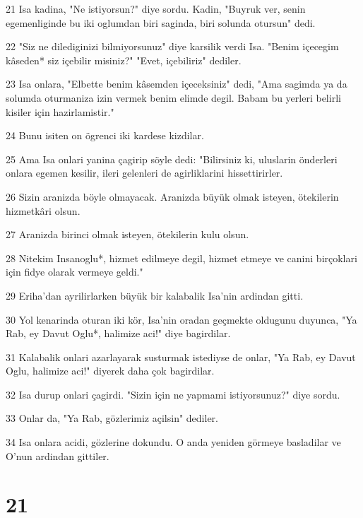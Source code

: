 \par 21 Isa kadina, "Ne istiyorsun?" diye sordu. Kadin, "Buyruk ver, senin egemenliginde bu iki oglumdan biri saginda, biri solunda otursun" dedi.
\par 22 "Siz ne dilediginizi bilmiyorsunuz" diye karsilik verdi Isa. "Benim içecegim kâseden* siz içebilir misiniz?" "Evet, içebiliriz" dediler.
\par 23 Isa onlara, "Elbette benim kâsemden içeceksiniz" dedi, "Ama sagimda ya da solumda oturmaniza izin vermek benim elimde degil. Babam bu yerleri belirli kisiler için hazirlamistir."
\par 24 Bunu isiten on ögrenci iki kardese kizdilar.
\par 25 Ama Isa onlari yanina çagirip söyle dedi: "Bilirsiniz ki, uluslarin önderleri onlara egemen kesilir, ileri gelenleri de agirliklarini hissettirirler.
\par 26 Sizin aranizda böyle olmayacak. Aranizda büyük olmak isteyen, ötekilerin hizmetkâri olsun.
\par 27 Aranizda birinci olmak isteyen, ötekilerin kulu olsun.
\par 28 Nitekim Insanoglu*, hizmet edilmeye degil, hizmet etmeye ve canini birçoklari için fidye olarak vermeye geldi."
\par 29 Eriha'dan ayrilirlarken büyük bir kalabalik Isa'nin ardindan gitti.
\par 30 Yol kenarinda oturan iki kör, Isa'nin oradan geçmekte oldugunu duyunca, "Ya Rab, ey Davut Oglu*, halimize aci!" diye bagirdilar.
\par 31 Kalabalik onlari azarlayarak susturmak istediyse de onlar, "Ya Rab, ey Davut Oglu, halimize aci!" diyerek daha çok bagirdilar.
\par 32 Isa durup onlari çagirdi. "Sizin için ne yapmami istiyorsunuz?" diye sordu.
\par 33 Onlar da, "Ya Rab, gözlerimiz açilsin" dediler.
\par 34 Isa onlara acidi, gözlerine dokundu. O anda yeniden görmeye basladilar ve O'nun ardindan gittiler.

\chapter{21}

